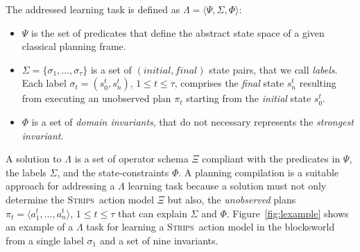 \documentclass{article}
\newcommand{\tup}[1]{{\langle #1 \rangle}}
\newcommand{\strips}{\textsc{Strips}}     %
\begin{document}
The addressed learning task is defined as $\Lambda=\tup{\Psi,\Sigma,\Phi}$:
\begin{itemize}
\item $\Psi$ is the set of predicates that define the abstract state space of a given classical planning frame.
\item $\Sigma=\{\sigma_1,\ldots,\sigma_{\tau}\}$ is a set of $(initial, final)$ state pairs, that we call {\em labels}. Each label $\sigma_t=(s_0^t,s_{n}^t)$, {\tt\small $1\leq t\leq \tau$}, comprises the {\em final} state $s_{n}^t$ resulting from executing an unobserved plan $\pi_t$ starting from the {\em initial} state $s_0^t$.
\item $\Phi$ is a set of {\em domain invariants}, that do not necessary represents the {\em strongest invariant}.
\end{itemize}

A solution to $\Lambda$ is a set of operator schema $\Xi$ compliant with the predicates in $\Psi$, the labels $\Sigma$, and the state-constraints $\Phi$. A planning compilation is a suitable approach for addressing a $\Lambda$ learning task because a solution must not only determine the \strips\ action model $\Xi$ but also, the {\em unobserved} plans $\pi_t=\tup{a_1^t, \ldots, a_n^t}$, {\tt\small $1\leq t\leq \tau$} that can explain $\Sigma$ and $\Phi$. Figure~\ref{fig:lexample} shows an example of a $\Lambda$ task for learning a \strips\ action model in the blocksworld from a single label $\sigma_1$ and a set of nine invariants.
\end{document}
